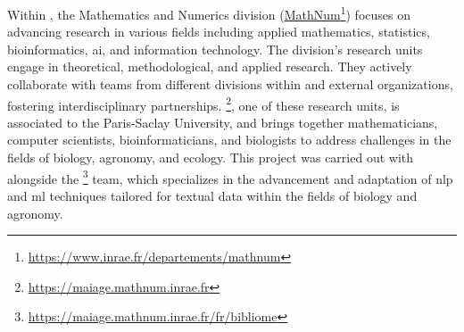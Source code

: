 Within \INRAE{}, the Mathematics and Numerics division (\href{https://www.inrae.fr/departements/mathnum}{MathNum}\footnote{\url{https://www.inrae.fr/departements/mathnum}}) focuses on advancing research in various fields including applied mathematics, statistics, bioinformatics, \gls{ai}, and information technology. The division's research units engage in theoretical, methodological, and applied research. They actively collaborate with teams from different divisions within \INRAE{} and external organizations, fostering interdisciplinary partnerships. \href{https://maiage.mathnum.inrae.fr}{\MAIAGE{}}\footnote{\url{https://maiage.mathnum.inrae.fr}}, one of these research units, is associated to the Paris-Saclay University, and brings together mathematicians, computer scientists, bioinformaticians, and biologists to address challenges in the fields of biology, agronomy, and ecology. This project was carried out with alongside the  \href{https://maiage.mathnum.inrae.fr/fr/bibliome}{\bibliome{}}\footnote{\url{https://maiage.mathnum.inrae.fr/fr/bibliome}} team, which specializes in the advancement and adaptation of \gls{nlp} and \gls{ml} techniques tailored for textual data within the fields of biology and agronomy.  


